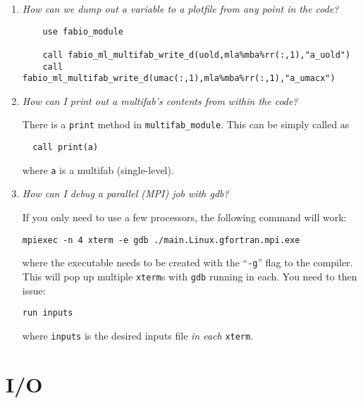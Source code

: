 \begin{enumerate}

\item {\em How can we dump out a variable to a plotfile from any point in the
   code?} 
%
\begin{verbatim}
    use fabio_module

    call fabio_ml_multifab_write_d(uold,mla%mba%rr(:,1),"a_uold")
    call fabio_ml_multifab_write_d(umac(:,1),mla%mba%rr(:,1),"a_umacx")
\end{verbatim}

\item {\em How can I print out a multifab's contents from within the code?}

  There is a {\tt print} method in {\tt multifab\_module}.  This can
  be simply called as
  \begin{verbatim}
  call print(a)
  \end{verbatim}
  where {\tt a} is a multifab (single-level).

\item {\em How can I debug a parallel (MPI) job with gdb?}

If you only need to use a few processors, the following command will work:
\begin{verbatim}
mpiexec -n 4 xterm -e gdb ./main.Linux.gfortran.mpi.exe 
\end{verbatim}
where the executable needs to be created with the ``{\tt -g}'' flag to
the compiler.  This will pop up multiple {\tt xterm}s with {\tt gdb} running
in each.  You need to then issue:
\begin{verbatim}
run inputs
\end{verbatim}
where {\tt inputs} is the desired inputs file {\em in each} {\tt xterm}.


\end{enumerate}


\section{I/O}

